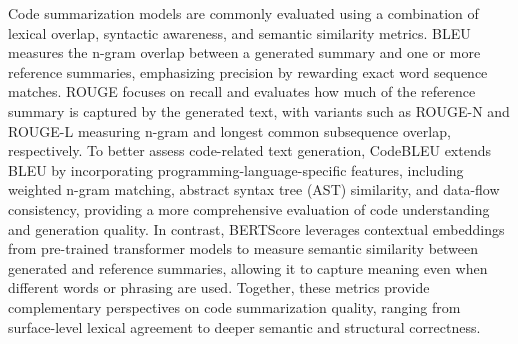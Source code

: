 Code summarization models are commonly evaluated using a combination of lexical overlap, syntactic awareness, and semantic similarity metrics. BLEU \cite{papineni2002bleu} measures the n-gram overlap between a generated summary and one or more reference summaries, emphasizing precision by rewarding exact word sequence matches. ROUGE \cite{lin2004rouge} focuses on recall and evaluates how much of the reference summary is captured by the generated text, with variants such as ROUGE-N and ROUGE-L measuring n-gram and longest common subsequence overlap, respectively. To better assess code-related text generation, CodeBLEU \cite{ren2020codebleu} extends BLEU by incorporating programming-language-specific features, including weighted n-gram matching, abstract syntax tree (AST) similarity, and data-flow consistency, providing a more comprehensive evaluation of code understanding and generation quality. In contrast, BERTScore \cite{zhang2019bertscore} leverages contextual embeddings from pre-trained transformer models to measure semantic similarity between generated and reference summaries, allowing it to capture meaning even when different words or phrasing are used. Together, these metrics provide complementary perspectives on code summarization quality, ranging from surface-level lexical agreement to deeper semantic and structural correctness.





